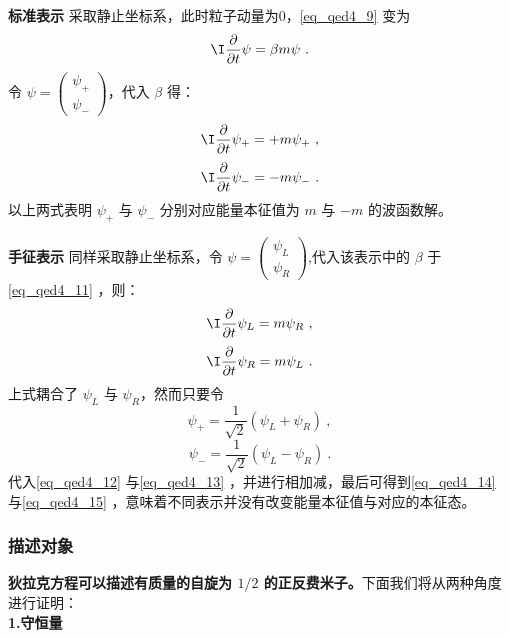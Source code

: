 \textbf{标准表示}
采取静止坐标系，此时粒子动量为0，\autoref{eq_qed4_9} 变为
\begin{equation}\label{eq_qed4_11}
 \I \frac{\partial}{\partial t} \psi= \beta m\psi~.
\end{equation}
令 $\psi=\left(\begin{array}{l}\psi_{+} \\ \psi_{-}\end{array}\right)$，代入 $\beta$ 得：
\begin{equation}\label{eq_qed4_14}
 \I \frac{\partial}{\partial t} \psi_{+}=+m \psi_{+}~,
\end{equation}
\begin{equation}\label{eq_qed4_15}
 \I \frac{\partial}{\partial t} \psi_{-}=-m \psi_{-}~.
\end{equation}
以上两式表明 $\psi_{+}$ 与 $\psi_{-}$ 分别对应能量本征值为 $m$ 与 $-m$ 的波函数解。

\textbf{手征表示} 同样采取静止坐标系，令 $\psi=\left(\begin{array}{l}\psi_{L} \\ \psi_{R}\end{array}\right)$,代入该表示中的 $\beta$ 于\autoref{eq_qed4_11} ，则：
\begin{equation}\label{eq_qed4_12}
 \I\frac{\partial}{\partial t} \psi_{L}=m \psi_{R}~,
\end{equation}
\begin{equation}\label{eq_qed4_13}
 \I\frac{\partial}{\partial t} \psi_{R}=m \psi_{L}~.
\end{equation}
上式耦合了 $\psi_{L}$ 与 $\psi_{R}$，然而只要令
\begin{equation}
\psi_{+}=\frac{1}{\sqrt{2}}\left(\psi_{L}+\psi_{R}\right)~,
\end{equation}
\begin{equation}
\psi_{-}=\frac{1}{\sqrt{2}}\left(\psi_{L}-\psi_{R}\right)~.
\end{equation}
代入\autoref{eq_qed4_12} 与\autoref{eq_qed4_13} ，并进行相加减，最后可得到\autoref{eq_qed4_14} 与\autoref{eq_qed4_15} ，意味着不同表示并没有改变能量本征值与对应的本征态。



\subsubsection{描述对象}
\textbf{狄拉克方程可以描述有质量的自旋为 $1/2$ 的正反费米子。}下面我们将从两种角度进行证明：\\
\textbf{1.守恒量}


